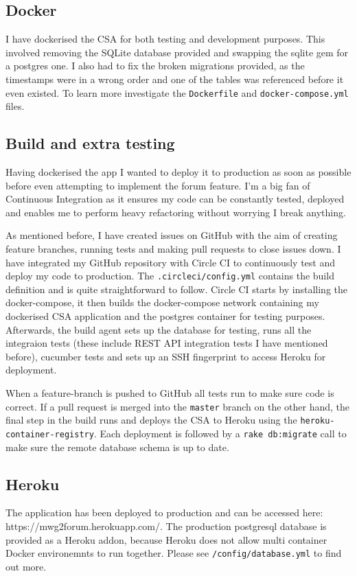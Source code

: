 \documentclass[a4paper, 11pt, titlepage]{article}
\begin{document}
\subsection{Docker}
I have dockerised the CSA for both testing and development purposes. This involved removing the
SQLite database provided and swapping the sqlite gem for a postgres one. I also had to
fix the broken migrations provided, as the timestamps were in a wrong order and one of the
tables was referenced before it even existed. To learn more investigate the \texttt{Dockerfile}
and \texttt{docker-compose.yml} files.

\subsection{Build and extra testing}
Having dockerised the app I wanted to deploy it to production as soon as possible before even
attempting to implement the forum feature. I'm a big fan of Continuous Integration as it
ensures my code can be constantly tested, deployed and enables me to perform heavy refactoring
without worrying I break anything.

As mentioned before, I have created issues on GitHub with the aim of creating feature branches,
running tests and making pull requests to close issues down. I have integrated my GitHub repository
with Circle CI to continuously test and deploy my code to production. The \texttt{.circleci/config.yml}
contains the build definition and is quite straightforward to follow. Circle CI starts by installing
the docker-compose, it then builds the docker-compose network containing my dockerised CSA application and
the postgres container for testing purposes. Afterwards, the build agent sets up the database for testing,
runs all the integraion tests (these include REST API integration tests I have mentioned before),
cucumber tests and sets up an SSH fingerprint to access Heroku for deployment.

When a feature-branch is pushed to GitHub all tests run to make sure code is correct. If a
pull request is merged into the \texttt{master} branch on the other hand, the final step
in the build runs and deploys the CSA to Heroku using the \texttt{heroku-container-registry}.
Each deployment is followed by a \texttt{rake db:migrate} call to make sure the remote database
schema is up to date.

\subsection{Heroku}
The application has been deployed to production and can be accessed here: https://mwg2forum.herokuapp.com/.
The production postgresql database is provided as a Heroku addon, because Heroku does not allow
multi container Docker environemnts to run together. Please see \texttt{/config/database.yml} to find
out more.
\end{document}
